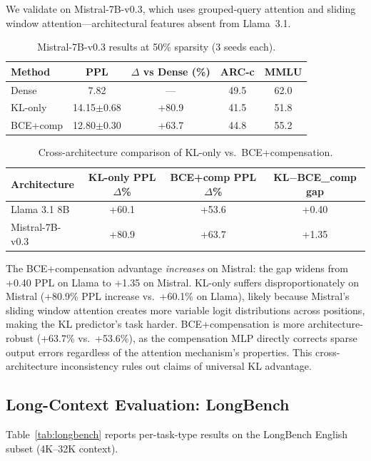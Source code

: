 \documentclass[11pt]{article}
\begin{document}
We validate on Mistral-7B-v0.3, which uses grouped-query attention and sliding window attention---architectural features absent from Llama~3.1.

\begin{table}[h]
\centering
\caption{Mistral-7B-v0.3 results at 50\% sparsity (3 seeds each).}
\label{tab:mistral}
\small
\begin{tabular}{lcccc}
\toprule
Method & PPL & $\Delta$ vs Dense (\%) & ARC-c & MMLU \\
\midrule
Dense & 7.82 & --- & 49.5 & 62.0 \\
KL-only & 14.15$\pm$0.68 & +80.9 & 41.5 & 51.8 \\
BCE+comp & 12.80$\pm$0.30 & +63.7 & 44.8 & 55.2 \\
\bottomrule
\end{tabular}
\end{table}

\begin{table}[h]
\centering
\caption{Cross-architecture comparison of KL-only vs.\ BCE+compensation.}
\label{tab:cross_arch}
\small
\begin{tabular}{lccc}
\toprule
Architecture & KL-only PPL $\Delta$\% & BCE+comp PPL $\Delta$\% & KL$-$BCE\_comp gap \\
\midrule
Llama 3.1 8B & +60.1 & +53.6 & +0.40 \\
Mistral-7B-v0.3 & +80.9 & +63.7 & +1.35 \\
\bottomrule
\end{tabular}
\end{table}

The BCE+compensation advantage \emph{increases} on Mistral: the gap widens from +0.40 PPL on Llama to +1.35 on Mistral.
KL-only suffers disproportionately on Mistral (+80.9\% PPL increase vs.\ +60.1\% on Llama), likely because Mistral's sliding window attention creates more variable logit distributions across positions, making the KL predictor's task harder.
BCE+compensation is more architecture-robust (+63.7\% vs.\ +53.6\%), as the compensation MLP directly corrects sparse output errors regardless of the attention mechanism's properties.
This cross-architecture inconsistency rules out claims of universal KL advantage.

\subsection{Long-Context Evaluation: LongBench}

Table~\ref{tab:longbench} reports per-task-type results on the LongBench English subset (4K--32K context).
\end{document}
